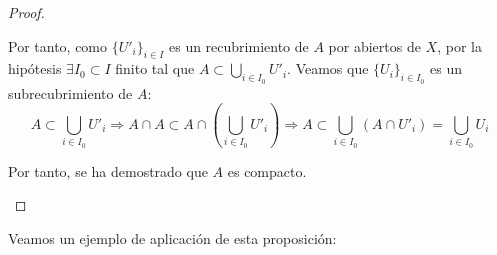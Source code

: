 \begin{proof}
\begin{description}
        Por tanto, como $\{U'_i\}_{i\in I}$ es un recubrimiento de $A$ por abiertos de $X$, por la hipótesis $\exists I_0\subset I$ finito tal que $A\subset \bigcup\limits_{i\in I_0}U'_i$.
        Veamos que $\{U_i\}_{i\in I_0}$ es un subrecubrimiento de $A$:
        \begin{equation*}
            A\subset \bigcup_{i\in I_0}U'_i \Longrightarrow A\cap A \subset A\cap \left(\bigcup_{i\in I_0}U'_i\right) \Longrightarrow A \subset \bigcup_{i\in I_0}(A\cap U'_i) = \bigcup_{i\in I_0}U_i
        \end{equation*}

        Por tanto, se ha demostrado que $A$ es compacto.
    \end{description}
\end{proof}

Veamos un ejemplo de aplicación de esta proposición:
